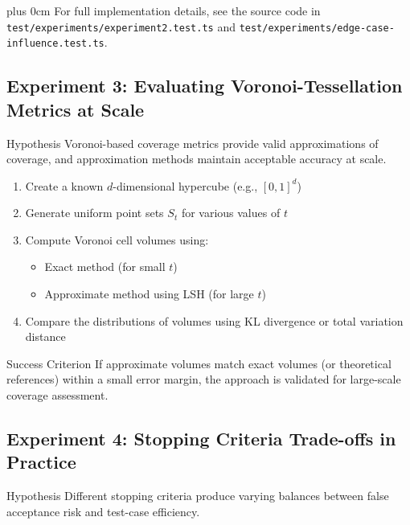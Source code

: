 \documentclass[11pt,a4paper]{article}
\newcommand{\justifytext}{\leftskip=0pt \rightskip=0pt plus 0cm}
\begin{document}
\justifytext
For full implementation details, see the source code in \texttt{test/experiments/experiment2.test.ts} and \texttt{test/experiments/edge-case-influence.test.ts}.

\subsection{Experiment 3: Evaluating Voronoi-Tessellation Metrics at Scale}

\begin{theorembox}{Hypothesis}
Voronoi-based coverage metrics provide valid approximations of coverage, and approximation methods maintain acceptable accuracy at scale.
\end{theorembox}

\begin{tcolorbox}[
  colback=blue!5!white,
  colframe=blue!75!black,
  title=Experimental Design,
  fonttitle=\bfseries
]
\begin{enumerate}
\item Create a known $d$-dimensional hypercube (e.g., $[0,1]^d$)
\item Generate uniform point sets $S_t$ for various values of $t$
\item Compute Voronoi cell volumes using:
   \begin{itemize}
   \item Exact method (for small $t$)
   \item Approximate method using LSH (for large $t$)
   \end{itemize}
\item Compare the distributions of volumes using KL divergence or total variation distance
\end{enumerate}
\end{tcolorbox}

\begin{definitionbox}{Success Criterion}
If approximate volumes match exact volumes (or theoretical references) within a small error margin, the approach is validated for large-scale coverage assessment.
\end{definitionbox}

\subsection{Experiment 4: Stopping Criteria Trade-offs in Practice}

\begin{theorembox}{Hypothesis}
Different stopping criteria produce varying balances between false acceptance risk and test-case efficiency.
\end{theorembox}
\end{document}
